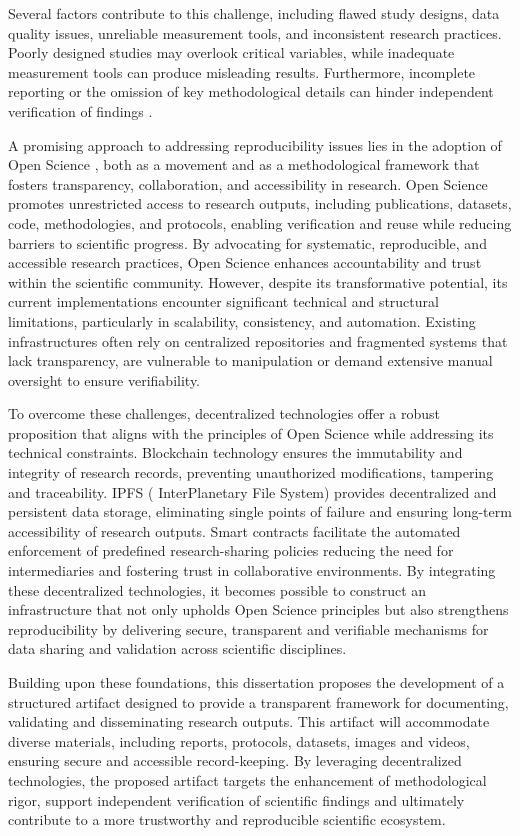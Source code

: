 \documentclass[final]{rc-book-2.14}
\begin{document}
Several factors contribute to this challenge, including flawed study designs, data quality issues, unreliable measurement tools, and inconsistent research practices. Poorly designed studies may overlook critical variables, while inadequate measurement tools can produce misleading results. Furthermore, incomplete reporting or the omission of key methodological details can hinder independent verification of findings \cite{freedman_economics_2015}.

A promising approach to addressing reproducibility issues lies in the adoption of Open Science \cite{foster_open_2017}, both as a movement and as a methodological framework that fosters transparency, collaboration, and accessibility in research. Open Science promotes unrestricted access to research outputs, including publications, datasets, code, methodologies, and protocols, enabling verification and reuse while reducing barriers to scientific progress. By advocating for systematic, reproducible, and accessible research practices, Open Science enhances accountability and trust within the scientific community. However, despite its transformative potential, its current implementations encounter significant technical and structural limitations, particularly in scalability, consistency, and automation. Existing infrastructures often rely on centralized repositories and fragmented systems that lack transparency, are vulnerable to manipulation or demand extensive manual oversight to ensure verifiability.

To overcome these challenges, decentralized technologies offer a robust proposition that aligns with the principles of Open Science while addressing its technical constraints. Blockchain technology ensures the immutability and integrity of research records, preventing unauthorized modifications, tampering and traceability. IPFS ( InterPlanetary File System) provides decentralized and persistent data storage, eliminating single points of failure and ensuring long-term accessibility of research outputs. Smart contracts facilitate the automated enforcement of predefined research-sharing policies reducing the need for intermediaries and fostering trust in collaborative environments. By integrating these decentralized technologies, it becomes possible to construct an infrastructure that not only upholds Open Science principles but also strengthens reproducibility by delivering secure, transparent and verifiable mechanisms for data sharing and validation across scientific disciplines.

Building upon these foundations, this dissertation proposes the development of a structured artifact designed to provide a transparent framework for documenting, validating and disseminating research outputs. This artifact will accommodate diverse materials, including reports, protocols, datasets, images and videos, ensuring secure and accessible record-keeping. By leveraging decentralized technologies, the proposed artifact targets the enhancement of methodological rigor, support independent verification of scientific findings and ultimately contribute to a more trustworthy and reproducible scientific ecosystem.
\end{document}
